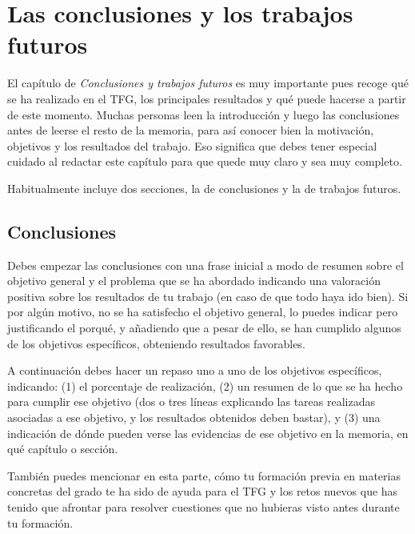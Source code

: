\chapter{Las conclusiones y los trabajos futuros}
\label{cap:Conclusiones}

El capítulo de \textit{Conclusiones y trabajos futuros} es muy importante pues recoge qué se ha realizado en el TFG, los principales resultados y qué puede hacerse a partir de este momento. Muchas personas leen la introducción y luego las conclusiones antes de leerse el resto de la memoria, para así conocer bien la motivación, objetivos y los resultados del trabajo. Eso significa que debes tener especial cuidado al redactar este capítulo para que quede muy claro y sea muy completo.

Habitualmente incluye dos secciones, la de conclusiones y la de trabajos futuros.
 
 \section{Conclusiones}

Debes empezar las conclusiones con una frase inicial a modo de resumen sobre el objetivo general y el problema que se ha abordado indicando una valoración positiva sobre los resultados de tu trabajo (en caso de que todo haya ido bien). Si por algún motivo, no se ha satisfecho el objetivo general, lo puedes indicar pero justificando el porqué, y añadiendo que a pesar de ello, se han cumplido algunos de los objetivos específicos, obteniendo resultados favorables. 

A continuación debes hacer un repaso uno a uno de los objetivos específicos, indicando: (1) el porcentaje de realización, (2) un resumen de lo que se ha hecho para cumplir ese objetivo (dos o tres líneas explicando las tareas realizadas asociadas a ese objetivo, y los resultados obtenidos deben bastar), y (3) una indicación de dónde pueden verse las evidencias de ese objetivo en la memoria, en qué capítulo o sección.

También puedes mencionar en esta parte, cómo tu formación previa en materias concretas del grado te ha sido de ayuda para el TFG y los retos nuevos que has tenido que afrontar para resolver cuestiones que no hubieras visto antes durante tu formación.

